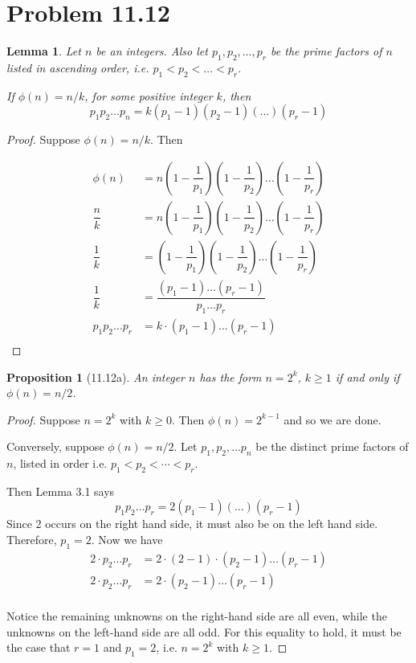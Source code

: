 \documentclass[letterpaper, 12pt, oneside]{memoir}
\theoremstyle{mystyle}
\newtheorem{prop}[thm]{Proposition}
\newtheorem{lemma}[thm]{Lemma}
\begin{document}
\section{Problem 11.12} 

\begin{lemma}
    Let $n$ be an integers. Also let $p_1, p_2, \ldots, p_r$ be the prime
    factors of $n$ listed in ascending order, i.e. $p_1 < p_2 < \ldots < p_r$.
    
    If $\phi(n) = n/k$, for some positive integer $k$, then
    \[p_1 p_2 \ldots p_n = k(p_1 - 1)(p_2 - 1)(\ldots)(p_r - 1) \]
\end{lemma}
\begin{proof}
    Suppose $\phi(n) = n/k$. Then

    \begin{align*}
        \phi(n) &= n \left( 1 - \dfrac{1}{p_1} \right) \left( 1 - \dfrac{1}{p_2} \right) \dots \left( 1 - \dfrac{1}{p_r} \right) \\
        \dfrac{n}{k} &= n \left( 1 - \dfrac{1}{p_1} \right) \left( 1 - \dfrac{1}{p_2} \right) \dots \left( 1 - \dfrac{1}{p_r} \right) \\
        \dfrac{1}{k} &= \left( 1 - \dfrac{1}{p_1} \right) \left( 1 - \dfrac{1}{p_2} \right) \dots \left( 1 - \dfrac{1}{p_r} \right) \\
        \dfrac{1}{k} &= \dfrac{(p_1 - 1) \dots (p_r - 1)}{p_1 \dots p_r} \\
        p_1 p_2 \dots p_r &= k \cdot (p_1 - 1) \dots (p_r - 1) \\
    \end{align*}
\end{proof}

\begin{prop}[11.12a]
    An integer $n$ has the form $n=2^k$, $k \geq 1$ if and only if 
    $\phi(n) = n/2$.
\end{prop}
\begin{proof}
    Suppose $n=2^k$ with $k \geq 0$. Then $\phi(n) = 2^{k-1}$ and so we are
    done.
    
    Conversely, suppose $\phi(n)=n/2$. Let $p_1, p_2, \dots p_n$ be the distinct
    prime factors of $n$, listed in order i.e. $p_1 < p_2 < \cdots < p_r$.
    
    Then Lemma 3.1 says
    \[ p_1 p_2 \ldots p_r = 2 (p_1 - 1)(\ldots)(p_r - 1) \]
    Since 2 occurs on the right hand side, it must also be on the left hand
    side. Therefore, $p_1 = 2$. Now we have
    \begin{align*}
    2 \cdot p_2 \dots p_r &= 2 \cdot (2 - 1) \cdot (p_2 - 1) \dots (p_r - 1) \\
    2 \cdot p_2 \dots p_r &= 2 \cdot (p_2 - 1) \dots (p_r - 1) \\
    \end{align*}
    
    Notice the remaining unknowns on the right-hand side are all even, while
    the unknowns on the left-hand side are all odd. For this equality to hold,
    it must be the case that $r=1$ and $p_1 = 2$, i.e. $n=2^k$ with $k \geq 1$.
\end{proof}
\end{document}
